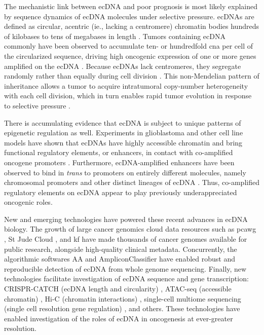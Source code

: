 \par The mechanistic link between \gls{ecDNA} and poor prognosis is most likely explained by sequence dynamics of \gls{ecDNA} molecules under selective pressure. \gls{ecDNA}s are defined as circular, acentric (ie., lacking a centromere) chromatin bodies hundreds of kilobases to tens of megabases in length \cite{Verhaak_2019}. Tumors containing ecDNA commonly have been observed to accumulate ten- or hundredfold  \gls{cna} per cell of the circularized sequence, driving high oncogenic expression of one or more genes amplified on the ecDNA \cite{Turner_2017}. Because \gls{ecDNA}s lack centromeres, they segregate randomly rather than equally during cell division \cite{Lange_2021}. This non-Mendelian pattern of inheritance allows a tumor to acquire intratumoral copy-number heterogeneity with each cell division, which in turn enables rapid tumor evolution in response to selective pressure \cite{Verhaak_2019,Gu_2020,Lange_2021}.

\par There is accumulating evidence that ecDNA is subject to unique patterns of epigenetic regulation as well. Experiments in glioblastoma and other cell line models have shown that \gls{ecDNA}s have highly accessible chromatin \cite{Wu_2019} and bring functional regulatory elements, or enhancers, in contact with co-amplified oncogene promoters \cite{Morton_2019,Helmsauer_2020}. Furthermore, ecDNA-amplified enhancers have been observed to bind in \textit{trans} to promoters on entirely different molecules, namely chromosomal promoters \cite{Zhu_2021} and other distinct lineages of ecDNA \cite{hung_2021}. Thus, co-amplified regulatory elements on \gls{ecDNA} appear to play previously underappreciated oncogenic roles.
\par New and emerging technologies have powered these recent advances in ecDNA biology. The growth of large cancer genomics cloud data resources such as \gls{pcawg} \cite{pcawg}, St Jude Cloud \cite{stjude}, and \gls{kf} \cite{kidsfirst} have made thousands of cancer genomes available for public research, alongside high-quality clinical metadata. Concurrently, the algorithmic softwares \gls{AA} \cite{AA} and AmpliconClassifier \cite{Kim_2020} have enabled robust and reproducible detection of \gls{ecDNA} from whole genome sequencing. Finally, new technologies facilitate investigation of \gls{ecDNA} sequence and gene transcription: CRISPR-CATCH (ecDNA length and circularity) \cite{crispr-catch}, ATAC-seq (accessible chromatin) \cite{atac-seq}, Hi-C (chromatin interactions) \cite{rao_2014}, single-cell multiome sequencing (single cell resolution gene regulation) \cite{scRNA+ATAC_protocol}, and others. These technologies have enabled investigation of the roles of ecDNA in oncogenesis at ever-greater resolution.

